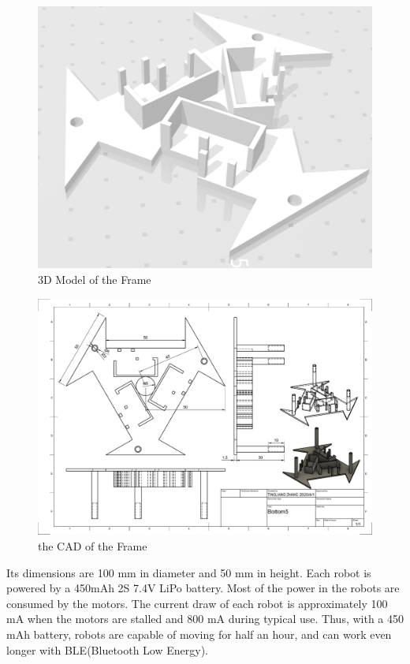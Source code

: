 \documentclass[sigconf]{acmart}
\begin{document}
\begin{figure}[h]
  \centering
  \includegraphics[width=\linewidth]{Frame.png}
  \caption{3D Model of the Frame}
  \label{fig:Frame}
\end{figure}

\begin{figure}[h]
  \centering
  \includegraphics[width=\linewidth]{Bottom.pdf}
  \caption{the CAD of the Frame}
  \label{fig:CAD}
\end{figure}

Its dimensions are 100 mm in diameter and 50 mm in height. Each robot is powered by a 450mAh 2S 7.4V LiPo battery. Most of the power in the robots are consumed by the motors. The current draw of each robot is approximately 100 mA when the motors are stalled and 800 mA during typical use. Thus, with a 450 mAh battery, robots are capable of moving for half an hour, and can work even longer with BLE(Bluetooth Low Energy). 
\end{document}
